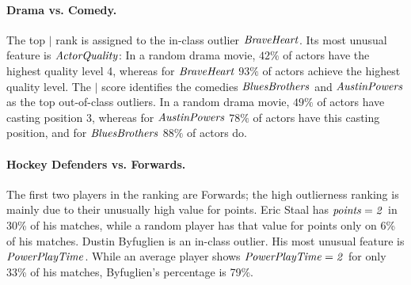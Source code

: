 {							\paragraph{Drama vs. Comedy.} 
							The top $\mid$ rank is assigned to the in-class outlier $\it{Brave Heart}$. Its most  unusual feature is  $\it{ActorQuality}$: In a random drama movie,  $42\%$ of actors have the highest quality level 4, whereas for $\it{Brave Heart}$ $93\%$ of actors achieve the highest quality level. 
							The  $\mid$ score identifies the comedies  $\it{Blues Brothers}$ and $\it{Austin Powers}$ as the top out-of-class outliers. 
							In a random drama movie,  $49\%$ of actors have casting position 3, whereas for $\it{Austin Powers}$ $78\%$ of actors have this casting position, and for $\it{Blues Brothers}$ $88\%$ of actors do. 
     						\paragraph{Hockey Defenders vs. Forwards.}
     						The first two players in the ranking are Forwards; the high outlierness ranking is mainly due to their unusually high value for points. Eric Staal has $\it{points=2}$ in 30\% of his matches, while a random player has that value for points only on 6\% of his matches. Dustin Byfuglien is an in-class outlier. His most unusual feature is $\it{Power Play Time}$. While an average player shows  $\it{Power Play Time=2}$ for only 33\% of his matches, Byfuglien's percentage is 79\%. 
%						

}
